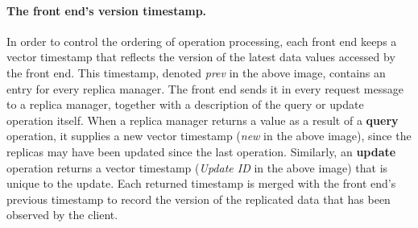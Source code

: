 \paragraph*{The front end's version timestamp.} In order to control the ordering of operation processing, each front end keeps a vector timestamp that reflects the version of the latest data values accessed by the front end. This timestamp, denoted \textit{prev} in the above image, contains an entry for every replica manager. The front end sends it in every request message to a replica manager, together with a description of the query or update operation itself. When a replica manager returns a value as a result of a \textbf{query} operation, it supplies a new vector timestamp (\textit{new} in the above image), since the replicas may have been updated since the last operation. Similarly, an \textbf{update} operation returns a vector timestamp (\textit{Update ID} in the above image) that is unique to the update. Each returned timestamp is merged with the front end’s previous timestamp to record the version of the replicated data that has been observed by the client.

